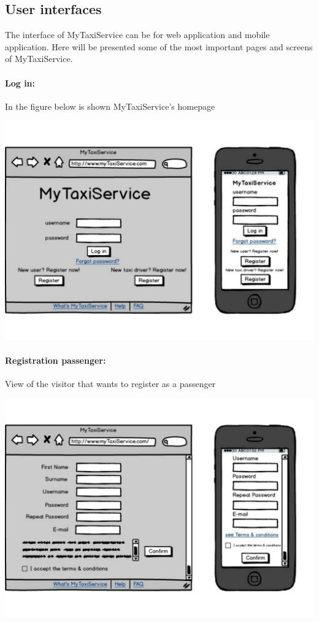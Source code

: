 \subsection{User interfaces}
The interface of MyTaxiService can be for web application and mobile application. Here will be presented some of the most important pages and screens of MyTaxiService.

\paragraph{Log in:}
	In the figure below is shown MyTaxiService's homepage
	\begin{center}
		\includegraphics[width=\textwidth]{mockup/login1.pdf}
	\end{center}
	
\paragraph{Registration passenger:}
	View of the visitor that wants to register as a passenger
\begin{center}
	\includegraphics[width=\textwidth]{mockup/registrationPassenger.pdf}
\end{center}
\newpage


